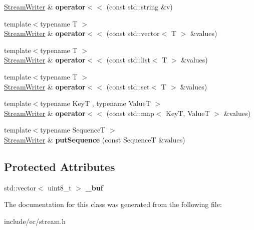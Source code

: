 \begin{DoxyCompactItemize}
\item 
\hypertarget{classStreamWriter_a4eb5e12ce9fdffe3ae59cdcebe20e6a2}{\hyperlink{classStreamWriter}{Stream\-Writer} \& {\bfseries operator$<$$<$} (const std\-::string \&v)}\label{classStreamWriter_a4eb5e12ce9fdffe3ae59cdcebe20e6a2}

\item 
\hypertarget{classStreamWriter_a112eba4cf1c47fcd04bc69beee2bb566}{{\footnotesize template$<$typename T $>$ }\\\hyperlink{classStreamWriter}{Stream\-Writer} \& {\bfseries operator$<$$<$} (const std\-::vector$<$ T $>$ \&values)}\label{classStreamWriter_a112eba4cf1c47fcd04bc69beee2bb566}

\item 
\hypertarget{classStreamWriter_a43dc9ca0eb36b6ef02bb747eadf69e5d}{{\footnotesize template$<$typename T $>$ }\\\hyperlink{classStreamWriter}{Stream\-Writer} \& {\bfseries operator$<$$<$} (const std\-::list$<$ T $>$ \&values)}\label{classStreamWriter_a43dc9ca0eb36b6ef02bb747eadf69e5d}

\item 
\hypertarget{classStreamWriter_a8fe2a586316b928e2e64f5bd20967e82}{{\footnotesize template$<$typename T $>$ }\\\hyperlink{classStreamWriter}{Stream\-Writer} \& {\bfseries operator$<$$<$} (const std\-::set$<$ T $>$ \&values)}\label{classStreamWriter_a8fe2a586316b928e2e64f5bd20967e82}

\item 
\hypertarget{classStreamWriter_aae933c2da69b6102b2e94b76de761f22}{{\footnotesize template$<$typename Key\-T , typename Value\-T $>$ }\\\hyperlink{classStreamWriter}{Stream\-Writer} \& {\bfseries operator$<$$<$} (const std\-::map$<$ Key\-T, Value\-T $>$ \&values)}\label{classStreamWriter_aae933c2da69b6102b2e94b76de761f22}

\item 
\hypertarget{classStreamWriter_a68e5364af74fb89cb427f375696ce962}{{\footnotesize template$<$typename Sequence\-T $>$ }\\\hyperlink{classStreamWriter}{Stream\-Writer} \& {\bfseries put\-Sequence} (const Sequence\-T \&values)}\label{classStreamWriter_a68e5364af74fb89cb427f375696ce962}

\end{DoxyCompactItemize}
\subsection*{Protected Attributes}
\begin{DoxyCompactItemize}
\item 
\hypertarget{classStreamWriter_a086e7a2f707af3d0f6dc1d2968bce7fb}{std\-::vector$<$ uint8\-\_\-t $>$ {\bfseries \-\_\-buf}}\label{classStreamWriter_a086e7a2f707af3d0f6dc1d2968bce7fb}

\end{DoxyCompactItemize}


The documentation for this class was generated from the following file\-:\begin{DoxyCompactItemize}
\item 
include/ec/stream.\-h\end{DoxyCompactItemize}
